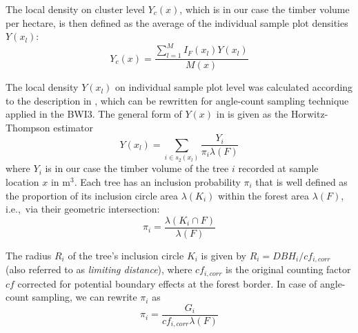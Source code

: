 \documentclass[remotesensing,article,accept,moreauthors,pdftex,10pt,a4paper]{Definitions/mdpi}
\begin{document}
The local density on cluster level $Y_{c}(x)$, which is in our case the timber volume per hectare, is then defined as the average of the individual sample plot densities $Y(x_l)$:
\begin{equation}\label{eq:locdens_clust}
Y_{c}(x)  =  \frac{\sum_{l = 1}^{M} I_{F}(x_{l}) Y(x_l)}{M(x)}
\end{equation}

The local density $Y(x_l)$ on individual sample plot level was calculated according to the description in \citet{mandallaz2008}, which can be rewritten for angle-count sampling technique applied in the BWI3. The general form of $Y(x)$ in \citet{mandallaz2008} is given as the Horwitz-Thompson estimator 
\begin{equation}\label{eq:locdens_plot}
Y(x_l) = \sum_{i \in s_{2}(x_l)}\frac{Y_i}{\pi_{i}\lambda(F)}
\end{equation}
where $Y_i$ is in our case the timber volume of the tree $i$ recorded at sample location $x$ in m$^3$. Each tree has an inclusion probability $\pi_{i}$ that is well defined as the proportion of its inclusion circle area $\lambda(K_i)$ within the forest area $\lambda(F)$, i.e.,~via their geometric intersection:
%
\begin{equation}\label{locdens_plot_1}
\pi_{i}  =  \frac{\lambda(K_i \cap F)}{\lambda(F)}
\end{equation}

The radius $R_i$ of the tree's inclusion circle $K_i$ is given by $R_i  =  DBH_{i}/cf_{i,corr}$ (also referred to as \textit{limiting distance}), where $cf_{i,corr}$ is the original counting factor $cf$ corrected for potential boundary effects at the forest border. In case of angle-count sampling, we can rewrite $\pi_{i}$ as
\begin{equation}\label{eq:locdens_plot_2}
\pi_{i}  =  \frac{G_i}{cf_{i,corr}\lambda(F)}
\end{equation}
\end{document}
